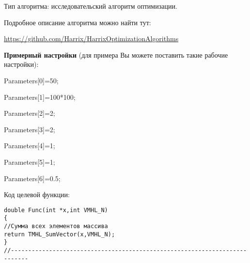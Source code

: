 \documentclass[a4paper,12pt]{article}
\begin{document}
Тип алгоритма: исследовательский алгоритм оптимизации.

Подробное описание алгоритма можно найти тут:

\href{https://github.com/Harrix/HarrixOptimizationAlgorithms/blob/master/\_HarrixOptimizationAlgorithms.pdf}{https://github.com/Harrix/HarrixOptimizationAlgorithms}

\textbf{Примерный настройки} (для примера Вы можете поставить такие рабочие настройки):

 Parameters[0]=50;
 
Parameters[1]=100*100;

Parameters[2]=2;

Parameters[3]=2;

Parameters[4]=1;

Parameters[5]=1;

Parameters[6]=0.5;

Код целевой функции:
\begin{lstlisting}[caption=Оптимизируемая функция]
double Func(int *x,int VMHL_N)
{
//Сумма всех элементов массива
return TMHL_SumVector(x,VMHL_N);
}
//---------------------------------------------------------------------------
\end{lstlisting}
\end{document}
